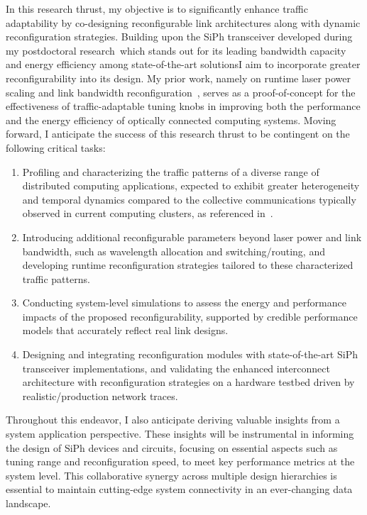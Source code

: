 In this research thrust, my objective is to significantly enhance traffic adaptability by co-designing reconfigurable link architectures along with dynamic reconfiguration strategies. Building upon the SiPh transceiver developed during my postdoctoral research~\cite{wangScalableArchitectureSubpJ2023,wangCICC2024}\textemdash which stands out for its leading bandwidth capacity and energy efficiency among state-of-the-art solutions\textemdash I aim to incorporate greater reconfigurability into its design. My prior work, namely on runtime laser power scaling and link bandwidth reconfiguration~\cite{wangTaskMappingAssistedLaser2019,wangTrafficAdaptivePowerReconfiguration2021,brianJOCN}, serves as a proof-of-concept for the effectiveness of traffic-adaptable tuning knobs in improving both the performance and the energy efficiency of optically connected computing systems. Moving forward, I anticipate the success of this research thrust to be contingent on the following critical tasks:
\begin{enumerate}[nosep]
    \item Profiling and characterizing the traffic patterns of a diverse range of distributed computing applications, expected to exhibit greater heterogeneity and temporal dynamics compared to the collective communications typically observed in current computing clusters, as referenced in~\cite{brianJOCN}.
    \item Introducing additional reconfigurable parameters beyond laser power and link bandwidth, such as wavelength allocation and switching/routing, and developing runtime reconfiguration strategies tailored to these characterized traffic patterns.
    \item Conducting system-level simulations to assess the energy and performance impacts of the proposed reconfigurability, supported by credible performance models that accurately reflect real link designs.
    \item Designing and integrating reconfiguration modules with state-of-the-art SiPh transceiver implementations, and validating the enhanced interconnect architecture with reconfiguration strategies on a hardware testbed driven by realistic/production network traces.
\end{enumerate}
Throughout this endeavor, I also anticipate deriving valuable insights from a system application perspective. These insights will be instrumental in informing the design of SiPh devices and circuits, focusing on essential aspects such as tuning range and reconfiguration speed, to meet key performance metrics at the system level. This collaborative synergy across multiple design hierarchies is essential to maintain cutting-edge system connectivity in an ever-changing data landscape.



